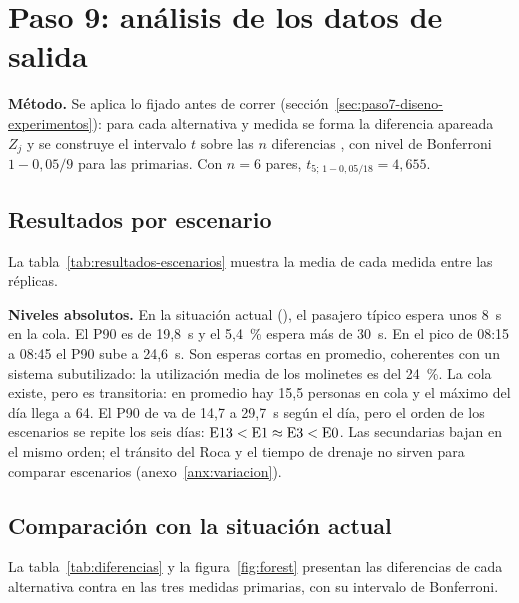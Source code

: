 \section{Paso 9: análisis de los datos de salida}
\label{sec:paso9-analisis}

\textbf{Método.} Se aplica lo fijado antes de correr (sección~\ref{sec:paso7-diseno-experimentos}): para cada
alternativa y medida se forma la diferencia apareada $Z_j$ y se construye el intervalo $t$ sobre las $n$
diferencias \parencite{law2015}, con nivel de Bonferroni $1 - 0{,}05/9$ para las primarias. Con $n = 6$ pares,
$t_{5;\,1-0{,}05/18} = 4{,}655$.

\subsection{Resultados por escenario}

La tabla~\ref{tab:resultados-escenarios} muestra la media de cada medida entre las réplicas.


\textbf{Niveles absolutos.} En la situación actual (\EO{}), el pasajero típico espera unos 8~s en la cola. El
P90 es de 19,8~s y el 5,4~\% espera más de 30~s. En el pico de 08:15 a 08:45 el P90 sube a 24,6~s. Son esperas
cortas en promedio, coherentes con un sistema subutilizado: la utilización media de los molinetes es del
24~\%. La cola existe, pero es transitoria: en promedio hay 15,5 personas en cola y el máximo del día llega
a 64. El P90 de \EO{} va de 14,7 a 29,7~s según el día, pero el orden de los escenarios se
repite los seis días: $\mbox{E13}{} < \mbox{E1}{} \approx \mbox{E3}{} < \mbox{E0}{}$. Las secundarias bajan en el mismo orden; el
tránsito del Roca y el tiempo de drenaje no sirven para comparar escenarios (anexo~\ref{anx:variacion}).

\subsection{Comparación con la situación actual}

La tabla~\ref{tab:diferencias} y la figura~\ref{fig:forest} presentan las diferencias de cada alternativa
contra \EO{} en las tres medidas primarias, con su intervalo de Bonferroni.


